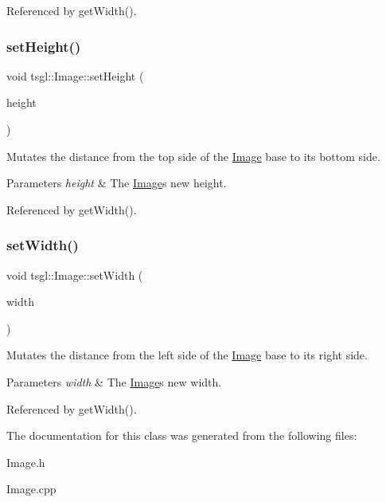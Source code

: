 Referenced by get\+Width().

\mbox{\label{classtsgl_1_1_image_adc7bfcf30f2bd707177488d471ed2d77}} 
\subsubsection{\texorpdfstring{set\+Height()}{setHeight()}}
{\footnotesize\ttfamily void tsgl\+::\+Image\+::set\+Height (\begin{DoxyParamCaption}\item[{G\+Lfloat}]{height }\end{DoxyParamCaption})}



Mutates the distance from the top side of the \hyperlink{classtsgl_1_1_image}{Image} base to its bottom side. 


\begin{DoxyParams}{Parameters}
{\em height} & The \hyperlink{classtsgl_1_1_image}{Image}\textquotesingle{}s new height. \\
\hline
\end{DoxyParams}


Referenced by get\+Width().

\mbox{\label{classtsgl_1_1_image_a4242ccf591c44bc4619dd2a867a801ff}} 
\subsubsection{\texorpdfstring{set\+Width()}{setWidth()}}
{\footnotesize\ttfamily void tsgl\+::\+Image\+::set\+Width (\begin{DoxyParamCaption}\item[{G\+Lfloat}]{width }\end{DoxyParamCaption})}



Mutates the distance from the left side of the \hyperlink{classtsgl_1_1_image}{Image} base to its right side. 


\begin{DoxyParams}{Parameters}
{\em width} & The \hyperlink{classtsgl_1_1_image}{Image}\textquotesingle{}s new width. \\
\hline
\end{DoxyParams}


Referenced by get\+Width().



The documentation for this class was generated from the following files\+:\begin{DoxyCompactItemize}
\item 
Image.\+h\item 
Image.\+cpp\end{DoxyCompactItemize}
